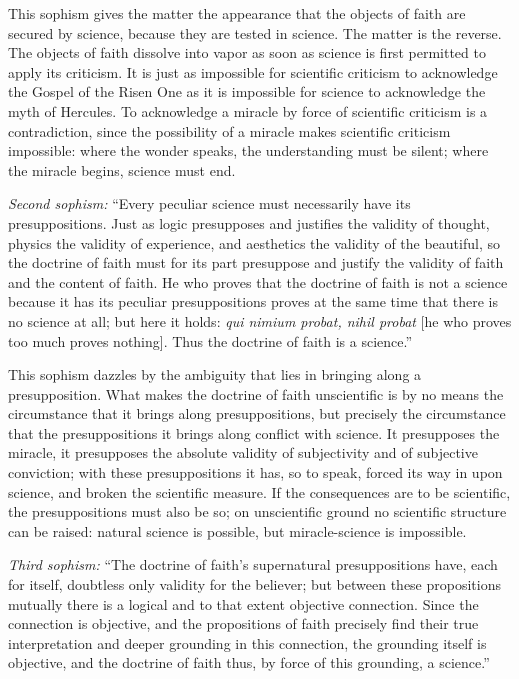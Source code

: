 \documentclass[12pt]{book}
\begin{document}
This sophism gives the matter the appearance that the objects of faith are secured by
science, because they are tested in science. The matter is the reverse. The objects of
faith dissolve into vapor as soon as science is first permitted to apply its criticism. It
is just as impossible for scientific criticism to acknowledge the Gospel of the Risen One
as it is impossible for science to acknowledge the myth of Hercules. To acknowledge a
miracle by force of scientific criticism is a contradiction, since the possibility of a
miracle makes scientific criticism impossible: where the wonder speaks, the understanding
must be silent; where the miracle begins, science must end.

\emph{Second sophism:} ``Every peculiar science must necessarily have its presuppositions.
Just as logic presupposes and justifies the validity of thought, physics the validity of
experience, and aesthetics the validity of the beautiful, so the doctrine of faith must for
its part presuppose and justify the validity of faith and the content of faith. He who
proves that the doctrine of faith is not a science because it has its peculiar
presuppositions proves at the same time that there is no science at all; but here it holds:
\textit{qui nimium probat, nihil probat} [he who proves too much proves nothing]. Thus the
doctrine of faith is a science.''

This sophism dazzles by the ambiguity that lies in bringing along a presupposition. What
makes the doctrine of faith unscientific is by no means the circumstance that it brings
along presuppositions, but precisely the circumstance that the presuppositions it brings
along conflict with science. It presupposes the miracle, it presupposes the absolute
validity of subjectivity and of subjective conviction; with these presuppositions it has,
so to speak, forced
its way in upon science, and broken the scientific measure. If the consequences are to be
scientific, the presuppositions must also be so; on unscientific ground no scientific
structure can be raised: natural science is possible, but miracle-science is impossible.

\emph{Third sophism:} ``The doctrine of faith's supernatural presuppositions have, each
for itself, doubtless only validity for the believer; but between these propositions
mutually there is a logical and to that extent objective connection. Since the connection
is objective, and the propositions of faith precisely find their true interpretation and
deeper grounding in this connection, the grounding itself is objective, and the doctrine of
faith thus, by force of this grounding, a science.''
\end{document}
